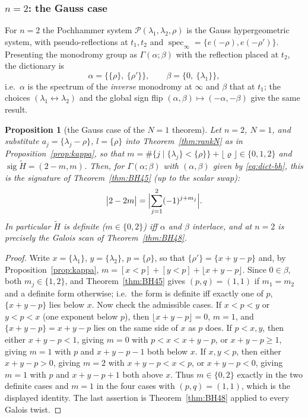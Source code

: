 \documentclass[11pt]{article}
\newtheorem{proposition}[theorem]{Proposition}
\theoremstyle{definition}
\newcommand{\Ht}{\widetilde H}
\newcommand{\frc}[1]{\{#1\}}
\begin{document}
\subsubsection{$n=2$: the Gauss case}
For $n=2$ the Pochhammer system $\mathcal P(\lambda_1,\lambda_2,\rho)$ is the
Gauss hypergeometric system, with pseudo-reflections at $t_1,t_2$ and
$\operatorname{spec}_\infty=\{e(-\rho),e(-\rho')\}$. Presenting the monodromy
group as $\Gamma(\alpha;\beta)$ with the reflection placed at $t_2$, the
dictionary is
\begin{equation}\label{eq:dict-bh}
\alpha=\bigl\{\frc{\rho},\ \frc{\rho'}\bigr\},
\qquad
\beta=\bigl\{0,\ \frc{\lambda_1}\bigr\},
\end{equation}
i.e.\ $\alpha$ is the spectrum of the \emph{inverse} monodromy at $\infty$ and
$\beta$ that at $t_1$; the choices $(\lambda_1\leftrightarrow\lambda_2)$ and
the global sign flip $(\alpha,\beta)\mapsto(-\alpha,-\beta)$ give the same
result.

\begin{proposition}[the Gauss case of the $N=1$ theorem]\label{prop:gauss-bh}
Let $n=2$, $N=1$, and substitute $a_j=\frc{\lambda_j-\rho}$, $l=\frc\rho$
into Theorem~\ref{thm:rankN} as in Proposition~\ref{prop:kappa}, so
that $m=\#\{j\mid\frc{\lambda_j}<\frc\rho\}+\lfloor\varrho\rfloor\in\{0,1,2\}$
and $\operatorname{sig}\Ht=(2-m,m)$. Then, for $\Gamma(\alpha;\beta)$
with $(\alpha,\beta)$ given by \eqref{eq:dict-bh}, this is the
signature of Theorem~\ref{thm:BH45} (up to the scalar swap):
\[
\bigl|2-2m\bigr|=\Bigl|\sum_{j=1}^{2}(-1)^{j+m_j}\Bigr| .
\]
In particular $\Ht$ is definite ($m\in\{0,2\}$) iff $\alpha$ and
$\beta$ interlace, and \cite[Thm.~1.2]{Haraoka1994} at $n=2$ is precisely the
Galois scan of Theorem~\ref{thm:BH48}.
\end{proposition}

\begin{proof}
Write $x=\frc{\lambda_1}$, $y=\frc{\lambda_2}$, $p=\frc\rho$, so that
$\frc{\rho'}=\frc{x+y-p}$ and, by Proposition~\ref{prop:kappa},
$m=[x<p]+[y<p]+\lfloor x+y-p\rfloor$. Since $0\in\beta$, both
$m_j\in\{1,2\}$, and Theorem~\ref{thm:BH45} gives $(p,q)=(1,1)$ if
$m_1=m_2$ and a definite form otherwise; i.e.\ the form is definite
iff exactly one of $p$, $\frc{x+y-p}$ lies below $x$. Now check the
admissible cases. If $x<p<y$ or $y<p<x$ (one exponent below $p$),
then $\lfloor x+y-p\rfloor=0$, $m=1$, and $\frc{x+y-p}=x+y-p$ lies on
the same side of $x$ as $p$ does. If $p<x,y$, then either $x+y-p<1$,
giving $m=0$ with $p<x<x+y-p$, or $x+y-p\ge1$, giving $m=1$ with
$p$ and $x+y-p-1$ both below $x$. If $x,y<p$, then either $x+y-p>0$,
giving $m=2$ with $x+y-p<x<p$, or $x+y-p<0$, giving $m=1$ with $p$ and
$x+y-p+1$ both above $x$. Thus $m\in\{0,2\}$ exactly in the two
definite cases and $m=1$ in the four cases with $(p,q)=(1,1)$, which
is the displayed identity. The last assertion is Theorem~\ref{thm:BH48}
applied to every Galois twist.
\end{proof}
\end{document}
